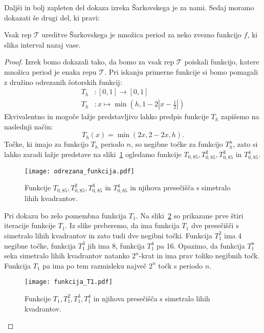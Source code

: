 \documentclass[../TG_magistrsko_delo_sections.tex]{subfiles}
\begin{document}
Daljši in bolj zapleten del dokaza izreka Šarkovskega je za nami. Sedaj moramo dokazati še drugi del, ki pravi:
\begin{izrek}
Vsak rep $\mathcal{T}$ ureditve Šarkovskega je množica period za neko zvezno funkcijo $f$, ki slika interval nazaj vase.
\end{izrek}
\begin{proof}
Izrek bomo dokazali tako, da bomo za vsak rep $\mathcal{T}$ poiskali funkcijo, katere množica period je enaka repu $\mathcal{T}$. Pri iskanju primerne funkcije si bomo pomagali z družino odrezanih šotorskih funkcij:
\begin{equation*} %
\begin{split}
T_h &:  [0, 1] \to [0, 1] \\ 
T_h &: x \mapsto \min \left(h, 1- 2 \left|x-\frac{1}{2} \right|\right)
\end{split}
\end{equation*}
Ekvivalentno in mogoče lažje predstavljivo lahko predpis funkcije $T_h$ zapišemo na naslednji način:
\begin{equation*} %
T_h(x) = \min(2x, 2-2x, h).
\end{equation*}
Točke, ki imajo za funkcijo $T_h$ periodo $n$, so negibne točke za funkcijo $T_h^n$, zato si lahko zaradi lažje predstave na sliki~\ref{fig:Th} ogledamo funkcije $T_{0,85}, T_{0,85}^2, T_{0,85}^3$ in $T_{0,85}^4$. 
\begin{figure}[h]
  \centering
  \texttt{[image: odrezana\_funkcija.pdf]}
  \caption[Primer vektorske slike.]{Funkcije  $T_{0,85}, T_{0,85}^2, T_{0,85}^3$ in $T_{0,85}^4$ in njihova presečišča s simetralo lihih kvadrantov.}
  \label{fig:Th}
\end{figure}

Pri dokazu bo zelo pomembna funkcija $T_1$. Na sliki~\ref{fig:T1} so prikazane prve štiri iteracije funkcije $T_1$. Iz slike preberemo, da ima funkcija $T_1$ dve presečišči s simetralo lihih kvadrantov in zato tudi dve negibni točki. Funkcija $T_1^2$ ima 4 negibne točke, funkcija $T_1^3$ jih ima 8, funkcija $T_1^4$ pa 16. Opazimo, da funkcija $T_1^n$ seka simetralo lihih kvadrantov natanko $2^n$-krat in ima prav toliko negibnih točk. Funkcija $T_1$ pa ima po tem razmisleku največ $2^n$ točk s periodo $n$.
\begin{figure}[h]
  \centering
  \texttt{[image: funkcija\_T1.pdf]}
  \caption[Primer vektorske slike.]{Funkcije $T_1, T_1^2, T_1^3, T_1^4$ in njihova presečišča s simetralo lihih kvadrantov.}
  \label{fig:T1}
\end{figure}


\end{proof}
\end{document}
